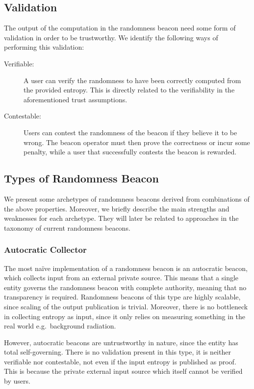 \subsection{Validation}
The output of the computation in the randomness beacon need some form of validation in order to be trustworthy.
We identify the following ways of performing this validation:

\begin{description}
    \item[Verifiable:]
        A user can verify the randomness to have been correctly computed from the provided entropy.
        This is directly related to the verifiability in the aforementioned trust assumptions.

    \item[Contestable:]
        Users can contest the randomness of the beacon if they believe it to be wrong.
        The beacon operator must then prove the correctness or incur some penalty, while a user that successfully contests the beacon is rewarded. 
\end{description}

\subsection{Types of Randomness Beacon}
We present some archetypes of randomness beacons derived from combinations of the above properties.
Moreover, we briefly describe the main strengths and weaknesses for each archetype.
They will later be related to approaches in the taxonomy of current randomness beacons.

\subsubsection{Autocratic Collector}\label{ssub:autocratic}
The most naïve implementation of a randomness beacon is an autocratic beacon, which collects input from an external private source.
This means that a single entity governs the randomness beacon with complete authority, meaning that no transparency is required.
Randomness beacons of this type are highly scalable, since scaling of the output publication is trivial.
Moreover, there is no bottleneck in collecting entropy as input, since it only relies on measuring something in the real world e.g.\ background radiation.

However, autocratic beacons are untrustworthy in nature, since the entity has total self-governing.
There is no validation present in this type, it is neither verifiable nor contestable, not even if the input entropy is published as proof.
This is because the private external input source which itself cannot be verified by users.

